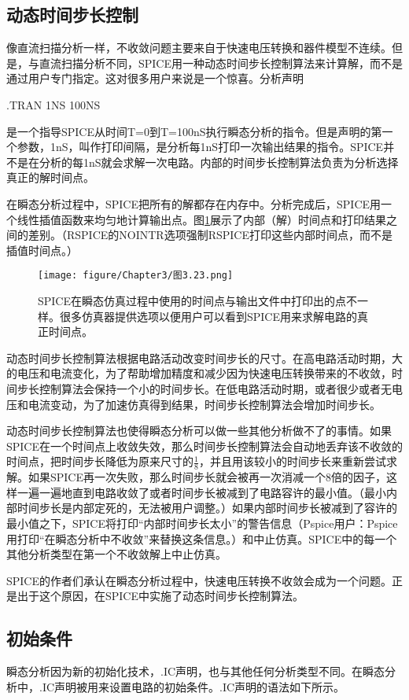 \subsection{动态时间步长控制}
像直流扫描分析一样，不收敛问题主要来自于快速电压转换和器件模型不连续。但是，与直流扫描分析不同，SPICE用一种动态时间步长控制算法来计算解，而不是通过用户专门指定。这对很多用户来说是一个惊喜。分析声明

.TRAN 1NS 100NS

是一个指导SPICE从时间T=0到T=100nS执行瞬态分析的指令。但是声明的第一个参数，1nS，叫作打印间隔，是分析每1nS打印一次输出结果的指令。SPICE并不是在分析的每1nS就会求解一次电路。内部的时间步长控制算法负责为分析选择真正的解时间点。

在瞬态分析过程中，SPICE把所有的解都存在内存中。分析完成后，SPICE用一个线性插值函数来均匀地计算输出点。图\ref{图3.23}展示了内部（解）时间点和打印结果之间的差别。（RSPICE的NOINTR选项强制RSPICE打印这些内部时间点，而不是插值时间点。）
\begin{figure}[htbp]
\small
    \centering
    \texttt{[image: figure/Chapter3/图3.23.png]}
    \caption{SPICE在瞬态仿真过程中使用的时间点与输出文件中打印出的点不一样。很多仿真器提供选项以便用户可以看到SPICE用来求解电路的真正时间点。}
    \label{图3.23}
\end{figure}

动态时间步长控制算法根据电路活动改变时间步长的尺寸。在高电路活动时期，大的电压和电流变化，为了帮助增加精度和减少因为快速电压转换带来的不收敛，时间步长控制算法会保持一个小的时间步长。在低电路活动时期，或者很少或者无电压和电流变动，为了加速仿真得到结果，时间步长控制算法会增加时间步长。

动态时间步长控制算法也使得瞬态分析可以做一些其他分析做不了的事情。如果SPICE在一个时间点上收敛失效，那么时间步长控制算法会自动地丢弃该不收敛的时间点，把时间步长降低为原来尺寸的$\frac{1}{8}$，并且用该较小的时间步长来重新尝试求解。如果SPICE再一次失败，那么时间步长就会被再一次消减一个8倍的因子，这样一遍一遍地直到电路收敛了或者时间步长被减到了电路容许的最小值。（最小内部时间步长是内部定死的，无法被用户调整。）如果内部时间步长被减到了容许的最小值之下，SPICE将打印“内部时间步长太小”的警告信息（Pspice用户：Pspice用打印“在瞬态分析中不收敛”来替换这条信息。）和中止仿真。SPICE中的每一个其他分析类型在第一个不收敛解上中止仿真。

SPICE的作者们承认在瞬态分析过程中，快速电压转换不收敛会成为一个问题。正是出于这个原因，在SPICE中实施了动态时间步长控制算法。

\subsection{初始条件}
瞬态分析因为新的初始化技术，.IC声明，也与其他任何分析类型不同。在瞬态分析中，.IC声明被用来设置电路的初始条件。.IC声明的语法如下所示。

